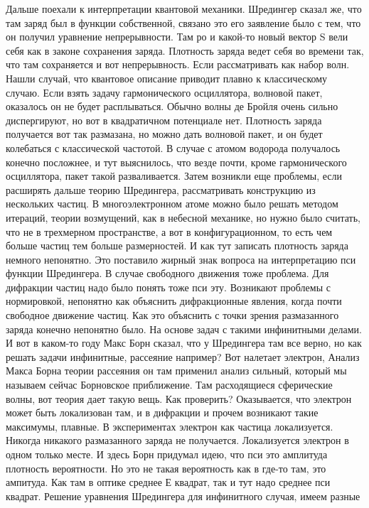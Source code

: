 \documentclass[a4paper, 12pt]{article}
\begin{document}
Дальше поехали к интерпретации квантовой механики. Шредингер сказал же, 
что там заряд был в функции собственной, связано это его заявление было 
с тем, что он получил уравнение непрерывности. Там ро и какой-то новый 
вектор S вели себя как в законе сохранения заряда. Плотность заряда 
ведет себя во времени так, что там сохраняется и вот непрерывность. Если 
рассматривать как набор волн. Нашли случай, что квантовое описание 
приводит плавно к классическому случаю. Если взять задачу гармонического 
осциллятора, волновой пакет, оказалось он не будет расплываться. Обычно 
волны де Бройля очень сильно диспергируют, но вот в квадратичном 
потенциале нет. Плотность заряда получается вот так размазана, но можно 
дать волновой пакет, и он будет колебаться с классической частотой. 
В случае с атомом водорода получалось конечно посложнее, и тут 
выяснилось, что везде почти, кроме гармонического осциллятора, пакет 
такой разваливается. Затем возникли еще проблемы, если расширять дальше 
теорию Шредингера, рассматривать конструкцию из нескольких частиц. 
В многоэлектронном атоме можно было решать методом итераций, теории 
возмущений, как в небесной механике, но нужно было считать, что не 
в трехмерном пространстве, а вот в конфигурационном, то есть чем больше 
частиц тем больше размерностей. И как тут записать плотность заряда 
немного непонятно. Это поставило жирный знак вопроса на интерпретацию 
пси функции Шредингера. В случае свободного движения тоже проблема. Для 
дифракции частиц надо было понять тоже пси эту. Возникают проблемы 
с нормировкой, непонятно как объяснить дифракционные явления, когда 
почти свободное движение частиц. Как это объяснить с точки зрения 
размазанного заряда конечно непонятно было. На основе задач с такими 
инфинитными делами. И вот в каком-то году Макс Борн сказал, что 
у Шредингера там все верно, но как решать задачи инфинитные, рассеяние 
например? Вот налетает электрон, Анализ Макса Борна теории рассеяния он 
там применил анализ сильный, который мы называем сейчас Борновское 
приближение. Там расходящиеся сферические волны, вот теория дает такую 
вещь. Как проверить? Оказывается, что электрон может быть локализован 
там, и в дифракции и прочем возникают такие максимумы, плавные. 
В экспериментах электрон как частица локализуется. Никогда никакого 
размазанного заряда не получается. Локализуется электрон в одном только 
месте. И здесь Борн придумал идею, что пси это амплитуда плотность 
вероятности. Но это не такая вероятность как в где-то там, это ампитуда. 
Как там в оптике среднее Е квадрат, так и тут надо среднее пси квадрат. 
Решение уравнения Шредингера для инфинитного случая, имеем разные 
\end{document}
